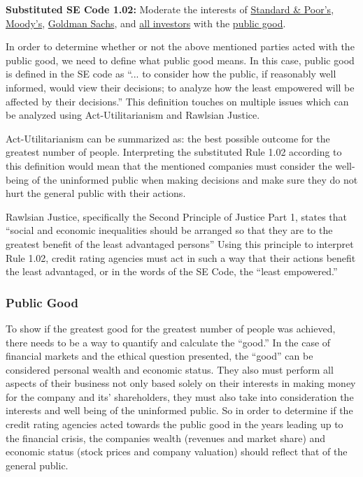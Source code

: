 \documentclass[11pt]{article}
\begin{document}
\begin{multicols}{2}
\begin{framed}
\noindent
   \textbf{Substituted SE Code 1.02: }  
   \newline
   Moderate the interests of \underline{Standard \& Poor's}, \underline{Moody's}, \underline{Goldman Sachs}, and \underline{all investors} with the \underline{public good}.
\end{framed}

In order to determine whether or not the above mentioned parties acted with the public good, we need to define what public good means.  In this case, public good is defined in the SE code as ``... to consider how the public, if reasonably well informed, would view their decisions; to analyze how the least empowered will be affected by their decisions.'' \cite{SEcode}  This definition touches on multiple issues which can be analyzed using Act-Utilitarianism and Rawlsian Justice. 

Act-Utilitarianism can be summarized as: the best possible outcome for the greatest number of people.\cite{utility}  Interpreting the substituted Rule 1.02 according to this definition would mean that the mentioned companies must consider the well-being of the uninformed public when making decisions and make sure they do not hurt the general public with their actions. 

Rawlsian Justice, specifically the Second Principle of Justice Part 1, states that ``social and economic inequalities should be arranged so that they are to the greatest benefit of the least advantaged persons'' \cite{rawlsian} Using this principle to interpret Rule 1.02, credit rating agencies must act in such a way that their actions benefit the least advantaged, or in the words of the SE Code, the ``least empowered.''  \cite{SEcode}

\subsubsection{Public Good}

To show if the greatest good for the greatest number of people was achieved, there needs to be a way to quantify and calculate the ``good.''  In the case of financial markets and the ethical question presented, the ``good'' can be considered personal wealth and economic status.  They also must perform all aspects of their business not only based solely on their interests in making money for the company and its' shareholders, they must also take into consideration the interests and well being of the uninformed public.  So in order to determine if the credit rating agencies acted towards the public good in the years leading up to the financial crisis, the companies wealth (revenues and market share) and economic status (stock prices and company valuation) should reflect that of the general public.


\end{multicols}
\end{document}
